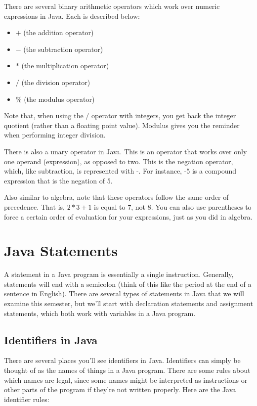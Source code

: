 There are several binary arithmetic operators which work over numeric expressions in Java. Each is described below:

\begin{itemize}
\item $+$ (the addition operator)
\item $-$ (the subtraction operator)
\item $*$ (the multiplication operator)
\item $/$ (the division operator)
\item $\%$ (the modulus operator)
\end{itemize}

Note that, when using the $/$ operator with integers, you get back the integer quotient (rather than a floating point value). Modulus gives you the reminder when performing integer division. 

There is also a unary operator in Java. This is an operator that works over only one  operand (expression), as opposed to two. This is the negation operator, which, like subtraction, is represented with -. For instance, -5 is a compound expression that is the negation of 5. 

Also similar to algebra, note that these operators follow the same order of precedence. That is, $2 * 3 + 1$ is equal to 7, not 8. You can also use parentheses to force a certain order of evaluation for your expressions, 
just as you did in algebra. 

\section{Java Statements}

A statement in a Java program is essentially a single instruction. Generally,
statements will end with a semicolon (think of this like the period at the end
of a sentence in English). There are several types of statements in Java that we will examine this semester, but we'll start with declaration statements and assignment statements, which both work with variables in a Java program. 

\subsection{Identifiers in Java}

There are several places you'll see identifiers in Java. Identifiers can simply be thought of as the names of things in a Java program. There are some rules about which names are legal, since some names might be interpreted as instructions or other parts of the program if they're not written properly. Here are the Java identifier rules:

